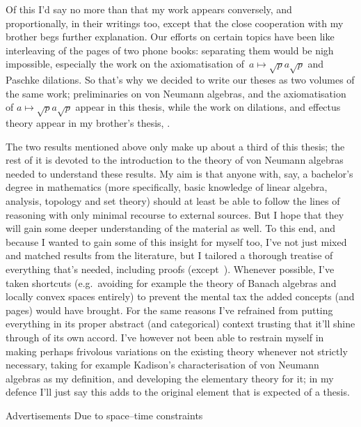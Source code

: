 \documentclass[b5paper]{book}
\begin{document}
\begin{parsec}{10}
\begin{point}{20}
Of this I'd say no more
than that my work appears conversely, and proportionally,
in their writings too, except that the close cooperation
with my brother begs further explanation.
Our efforts on certain topics have been like interleaving 
of the pages of two phone books:
separating them  would be nigh impossible,
especially the work on the axiomatisation
of~$a\mapsto \sqrt{p}a\sqrt{p}$ and Paschke dilations.
So that's why we decided to write our theses
as two volumes of the same work;
preliminaries on von Neumann algebras,
and the axiomatisation of $a\mapsto \sqrt{p}a\sqrt{p}$
appear in this thesis,
while the work on dilations,
and effectus theory appear in my brother's thesis,
\cite{bas}.
\end{point}
\begin{point}{30}
The two results mentioned above only
make up 
about a third of this thesis;
the rest of it is devoted to 
the introduction to the theory of von Neumann algebras
needed to understand these results.
My aim is that anyone 
with, say, a bachelor's degree in mathematics
(more specifically, basic knowledge of linear algebra,
analysis\cite{rudin1964principles}, 
topology\cite{willard}
and set theory\cite{devlin2012joy})
should at least be able to follow the lines of reasoning
with only minimal recourse to external sources.
But I hope that they will gain some deeper understanding
of the material as well.
To this end, and because I wanted to gain some of this insight
for myself too,
I've not just mixed
and matched
results from the literature,
but I tailored a thorough treatise
of everything that's needed,
including proofs (except~).
Whenever possible,
I've taken shortcuts
(e.g.~avoiding for example
the theory of Banach algebras
and locally convex spaces entirely)
to  prevent the mental tax
the added concepts
(and pages) would have brought.
For the same reasons
I've refrained from putting
everything in its proper abstract (and categorical\cite{maclane}) context
trusting that it'll shine through of its own accord.
I've however not been able to restrain
myself in making perhaps frivolous variations on the existing
theory whenever not strictly necessary,
taking for example Kadison's characterisation\cite{kadison1956}
of von Neumann algebras
as my definition,
and developing the elementary theory for it;
in my defence I'll just say this adds to
the original element that is expected of a thesis.
\end{point}
\begin{point}{40}{Advertisements}%
Due to space--time constraints

\end{point}
\end{parsec}
\end{document}
